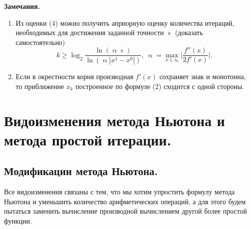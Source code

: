 \documentclass[a4paper, 12pt]{report}
\numberwithin{equation}{section}
\renewcommand{\geq}{\geqslant}
\renewcommand{\alpha}{\upalpha}
\renewcommand{\varepsilon}{\upvarepsilon}
\begin{document}
	\textbf{Замечания.}\begin{enumerate}
		\item Из оценки (4) можно получить априорную оценку количества итераций, необходимых для достижения заданной точности $\varepsilon$ (доказать самостоятельно)
		$$ k \geq \log_2 \dfrac{\ln(\alpha \varepsilon)}{\ln(\alpha |x^1 - x^0|)},\ \alpha = \underset{x\in s_0}{\max}\Big|\dfrac{f''(x)}{2f'(x)}\Big|.$$
		\item Если в окрестности корня производная $f'(x)$ сохраняет знак и монотонна, то приближение $x_k$ построенное по формуле (2) сходится с одной стороны.
	\end{enumerate}
	\section{Видоизменения метода Ньютона и метода простой итерации.}
	\subsection{Модификации метода Ньютона.}
	Все видоизменения связаны с тем, что мы хотим упростить формулу метода Ньютона и уменьшить количество арифметических операций, а для этого будем пытаться заменить вычисление производной вычислением другой более простой функции.
\end{document}
